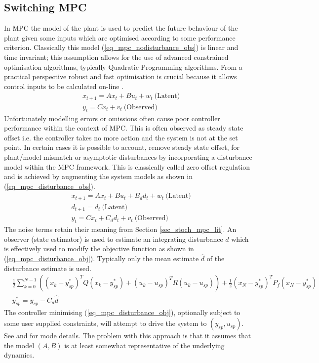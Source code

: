 \subsection{Switching MPC}
\label{sec_switch_mpc_lit}
In MPC the model of the plant is used to predict the future behaviour of the plant given some inputs which are optimised according to some performance criterion. Classically this model (\ref{eq_mpc_nodisturbance_obs}) is linear and time invariant; this assumption allows for the use of advanced constrained optimisation algorithms, typically Quadratic Programming algorithms. From a practical perspective robust and fast optimisation is crucial because it allows control inputs to be calculated on-line \cite{mac}.
\begin{equation}
\begin{aligned}
&x_{t+1} = Ax_t + Bu_t + w_t~\text{(Latent)} \\
&y_t = Cx_t + v_t~\text{(Observed)}
\end{aligned}
\label{eq_mpc_nodisturbance_obs}
\end{equation}
Unfortunately modelling errors or omissions often cause poor controller performance within the context of MPC. This is often observed as steady state offset i.e. the controller takes no more action and the system is not at the set point. In certain cases it is possible to account, remove steady state offset, for plant/model mismatch or asymptotic disturbances by incorporating a disturbance model within the MPC framework. This is classically called zero offset regulation \cite{raw} and is achieved by augmenting the system models as shown in (\ref{eq_mpc_disturbance_obs}).
\begin{equation}
\begin{aligned}
&x_{t+1} = Ax_t + Bu_t + B_d d_t + w_t~\text{(Latent)} \\
&d_{t+1} = d_t ~\text{(Latent)}\\
&y_t = Cx_t + C_d d_t + v_t~\text{(Observed)}
\end{aligned}
\label{eq_mpc_disturbance_obs}
\end{equation}
The noise terms retain their meaning from Section \ref{sec_stoch_mpc_lit}. An observer (state estimator) is used to estimate an integrating disturbance $d$ which is effectively used to modify the objective function as shown in (\ref{eq_mpc_disturbance_obj}). Typically only the mean estimate $\hat{d}$ of the disturbance estimate is used.
\begin{equation}
\begin{aligned}
&\frac{1}{2}\sum_{k=0}^{N-1} \left( (x_k-y_{sp}^*)^TQ(x_k-y_{sp}^*) + (u_k-u_{sp})^TR(u_k-u_{sp}) \right) + \frac{1}{2}(x_N-y_{sp}^*)^TP_f(x_N-y_{sp}^*) \\
&y_{sp}^* = y_{sp}-C_d \hat{d}
\end{aligned}
\label{eq_mpc_disturbance_obj}
\end{equation}
The controller minimising (\ref{eq_mpc_disturbance_obj}), optionally subject to some user supplied constraints, will attempt to drive the system to $(y_{sp}, u_{sp})$. See \cite{raw} and \cite{maeder} for mode details. The problem with this approach is that it assumes that the model $(A, B)$ is at least somewhat representative of the underlying dynamics.

